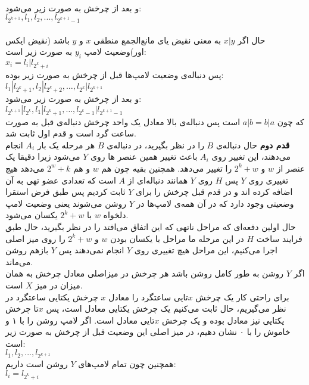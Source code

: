 \documentclass[12pt,a4paper]{article}
\begin{document}
\\
و بعد از چرخش به صورت زیر می‌شود:\\
$l_{2^{k+1}}, l_1, l_2, ..., l_{2^{k+1}-1}$
\\\\
حال اگر $x | y$ به معنی نقیض یای مانع‌الجمع منطقی $x$ و $y$ باشد  (نقیض ایکس اور)وضعیت لامپ $y_i$ به صورت زیر است:
\\
$x_i = l_i | l_{2^k + i}$
\\
پس دنباله‌ی وضعیت لامپ‌ها قبل از چرخش به صورت زیر بوده:
\\
$l_1 | l_{2^k + 1}, l_2 | l_{2^k + 2}, \dots, l_{2^k} | l_{2^{k + 1}}$
\\
و بعد از چرخش به صورت زیر می‌شود:
\\
$l_{2^{k+1}} | l_{2^k}, l_1 | l_{2^k + 1}, \dots, l_{2^k - 1} | l_{2^{k + 1} - 1}$
\\
که چون $a| b = b | a$ است پس دنباله‌ی بالا معادل یک واحد چرخش دنباله‌ی قبل به صورت ساعت گرد است و قدم اول ثابت شد.
\\
\textbf{قدم دوم}
حال دنباله‌ی $B$ را در نظر بگیرید، در دنباله‌ی $B$ هر مرحله یک بار $A_i$ انجام می‌دهند، این تغییر روی $A_i$ باعث تغییر همین عنصر ها روی $Y$ می‌شود زیرا دقیقا یک عنصر از $w$ و $2^k+w$ را تغییر می‌دهد. همچنین بقیه چون هم $w$ و هم $2^w+k$ می‌دهد هیچ تغییری روی $Y$ پس $H$ روی $Y$ همانند دنباله‌ای از $A$ است که تعدادی عضو تهی به آن اضافه کرده اند و در قدم قبل چرخش را برای $Y$ ثابت کردیم پس طبق فرض استقرا وضعیتی وجود دارد که در آن همه‌ی لامپ‌ها در $Y$ روشن می‌شوند یعنی وضعیت لامپ دلخواه $w$ با $2^k+w$ یکسان می‌شود.
\\
حال اولین دفعه‌ای که مراحل ناتهی که این اتفاق می‌افتد را در نظر بگیرید، حال طبق فرایند ساخت $H$ در این مرحله ما مراحل با یکسان بودن $w$ و $2^k+w$ را روی میز اصلی اجرا می‌کنیم، این مراحل هیچ تغییری روی $Y$ انجام نمی‌دهند پس $Y$ بازهم روشن می‌ماند. 
\\
اگر $Y$ روشن به طور کامل روشن باشد هر چرخش در میزاصلی معادل چرخش به همان میزان در میز $X$ است.
\\
برای راحتی کار یک چرخش $x$تایی ساعتگرد را معادل $x$ چرخش یکتایی ساعتگرد در نظر می‌گیریم، حال ثابت می‌کنیم یک چرخش یکتایی معادل است، پس $x$تا چرخش یکتایی نیز معادل بوده و یک چرخش $x$تایی معادل است.
اگر لامپ روشن را با ۱ و خاموش را با ۰ نشان دهیم، در میز اصلی این وضعیت قبل از چرخش به صورت زیر است:\\
$l_1, l_2, ..., l_{2^{k+1}}$ 
\\
همچنین چون تمام لامپ‌های $Y$ روشن است داریم:
\\
$l_i = l_{2^k + i}$
\\
\end{document}
